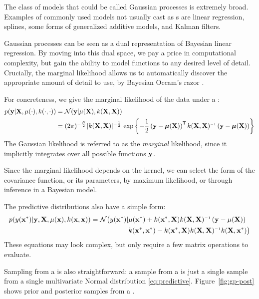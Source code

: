 The class of models that could be called Gaussian processes is extremely broad.
Examples of commonly used models not usually cast as \gp{}s are linear regression, splines, some forms of generalized additive models, and Kalman filters.

Gaussian processes can be seen as a dual representation of Bayesian linear regression. 
By moving into this dual space, we pay a price in computational complexity, but gain the ability to model functions to any desired level of detail.
Crucially, the marginal likelihood allows us to automatically discover the appropriate amount of detail to use, by Bayesian Occam's razor \citep{rasmussen2001occam,mackay2003information}.

For concreteness, we give the marginal likelihood of the data under a \gp{}:
%
\begin{align}
p(\vy | \vX, \mu(\cdot), k(\cdot, \cdot)) & = \N{\vy}{\mu(\vX)}{k(\vX, \vX)} \nonumber\\
& = (2\pi)^{-\frac{N}{2}}|k(\vX, \vX)|^{-\frac{1}{2}}\, \exp \left\{ -\frac{1}{2} \left( \vy - \boldsymbol\mu(\vX) \right)\tra k(\vX, \vX)\inv \left(\vy - \boldsymbol\mu(\vX) \right) \right\}
\label{eq:gp_marg_lik}
\end{align}
%
The Gaussian likelihood is referred to as the \emph{marginal} likelihood, since it implicitly integrates over all possible functions ${\bf{y}}$.

Since the marginal likelihood depends on the kernel, we can select the form of the covariance function, or its parameters, by maximum likelihood, or through inference in a Bayesian model.

The predictive distributions also have a simple form:
%
\begin{align}
p( y(\iva^*) | \vy, \vX, \mu(\iva), k(\iva, \iva)) 
= \mathcal{N} \big( y(\iva^*) | & \mu(\iva^*) + k(\iva^*, \vX) k(\vX, \vX)\inv \left( \vy - \mu(\vX) \right)  \nonumber \\
& k(\iva^*, \iva^*) - k(\iva^*, \vX) k(\vX, \vX)\inv k(\vX, \iva^*) \big)
\label{eq:predictive}
\end{align}
%
These equations may look complex, but only require a few matrix operations to evaluate.

Sampling from a \gp{} is also straightforward: a sample from a \gp{} is just a single sample from a single multivariate Normal distribution \eqref{eq:predictive}.
Figure~\ref{fig:gp-post} shows prior and posterior samples from a \gp{}.





